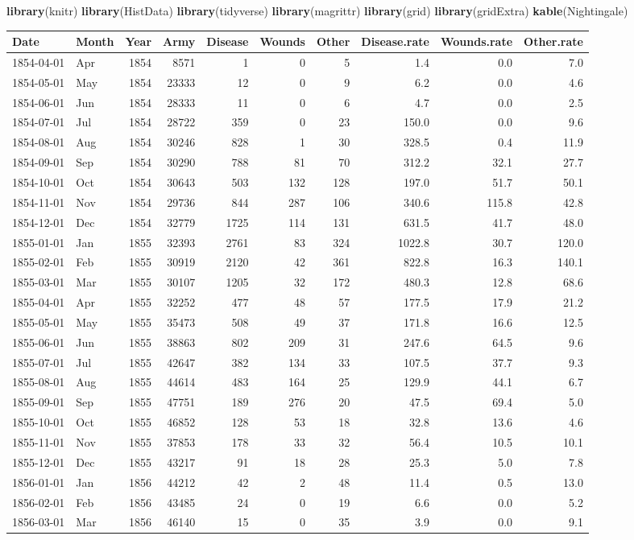 \documentclass[
]{article}
\newenvironment{Shaded}{\begin{snugshade}}{\end{snugshade}}
\newcommand{\KeywordTok}[1]{\textcolor[rgb]{0.13,0.29,0.53}{\textbf{#1}}}
\newcommand{\NormalTok}[1]{#1}
\begin{document}
\begin{Shaded}
\begin{Highlighting}[]
\KeywordTok{library}\NormalTok{(knitr)}
\KeywordTok{library}\NormalTok{(HistData)}
\KeywordTok{library}\NormalTok{(tidyverse)}
\KeywordTok{library}\NormalTok{(magrittr)}
\KeywordTok{library}\NormalTok{(grid)}
\KeywordTok{library}\NormalTok{(gridExtra)}
\KeywordTok{kable}\NormalTok{(Nightingale)}
\end{Highlighting}
\end{Shaded}

\begin{longtable}[]{@{}llrrrrrrrr@{}}
\toprule
Date & Month & Year & Army & Disease & Wounds & Other & Disease.rate &
Wounds.rate & Other.rate\tabularnewline
\midrule
\endhead
1854-04-01 & Apr & 1854 & 8571 & 1 & 0 & 5 & 1.4 & 0.0 &
7.0\tabularnewline
1854-05-01 & May & 1854 & 23333 & 12 & 0 & 9 & 6.2 & 0.0 &
4.6\tabularnewline
1854-06-01 & Jun & 1854 & 28333 & 11 & 0 & 6 & 4.7 & 0.0 &
2.5\tabularnewline
1854-07-01 & Jul & 1854 & 28722 & 359 & 0 & 23 & 150.0 & 0.0 &
9.6\tabularnewline
1854-08-01 & Aug & 1854 & 30246 & 828 & 1 & 30 & 328.5 & 0.4 &
11.9\tabularnewline
1854-09-01 & Sep & 1854 & 30290 & 788 & 81 & 70 & 312.2 & 32.1 &
27.7\tabularnewline
1854-10-01 & Oct & 1854 & 30643 & 503 & 132 & 128 & 197.0 & 51.7 &
50.1\tabularnewline
1854-11-01 & Nov & 1854 & 29736 & 844 & 287 & 106 & 340.6 & 115.8 &
42.8\tabularnewline
1854-12-01 & Dec & 1854 & 32779 & 1725 & 114 & 131 & 631.5 & 41.7 &
48.0\tabularnewline
1855-01-01 & Jan & 1855 & 32393 & 2761 & 83 & 324 & 1022.8 & 30.7 &
120.0\tabularnewline
1855-02-01 & Feb & 1855 & 30919 & 2120 & 42 & 361 & 822.8 & 16.3 &
140.1\tabularnewline
1855-03-01 & Mar & 1855 & 30107 & 1205 & 32 & 172 & 480.3 & 12.8 &
68.6\tabularnewline
1855-04-01 & Apr & 1855 & 32252 & 477 & 48 & 57 & 177.5 & 17.9 &
21.2\tabularnewline
1855-05-01 & May & 1855 & 35473 & 508 & 49 & 37 & 171.8 & 16.6 &
12.5\tabularnewline
1855-06-01 & Jun & 1855 & 38863 & 802 & 209 & 31 & 247.6 & 64.5 &
9.6\tabularnewline
1855-07-01 & Jul & 1855 & 42647 & 382 & 134 & 33 & 107.5 & 37.7 &
9.3\tabularnewline
1855-08-01 & Aug & 1855 & 44614 & 483 & 164 & 25 & 129.9 & 44.1 &
6.7\tabularnewline
1855-09-01 & Sep & 1855 & 47751 & 189 & 276 & 20 & 47.5 & 69.4 &
5.0\tabularnewline
1855-10-01 & Oct & 1855 & 46852 & 128 & 53 & 18 & 32.8 & 13.6 &
4.6\tabularnewline
1855-11-01 & Nov & 1855 & 37853 & 178 & 33 & 32 & 56.4 & 10.5 &
10.1\tabularnewline
1855-12-01 & Dec & 1855 & 43217 & 91 & 18 & 28 & 25.3 & 5.0 &
7.8\tabularnewline
1856-01-01 & Jan & 1856 & 44212 & 42 & 2 & 48 & 11.4 & 0.5 &
13.0\tabularnewline
1856-02-01 & Feb & 1856 & 43485 & 24 & 0 & 19 & 6.6 & 0.0 &
5.2\tabularnewline
1856-03-01 & Mar & 1856 & 46140 & 15 & 0 & 35 & 3.9 & 0.0 &
9.1\tabularnewline
\bottomrule
\end{longtable}
\end{document}

